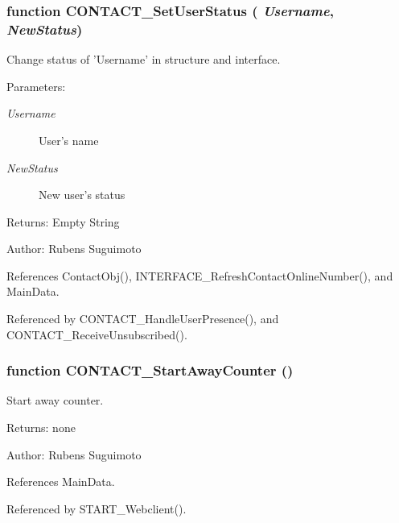 \subsubsection[CONTACT\_\-SetUserStatus]{\setlength{\rightskip}{0pt plus 5cm}function CONTACT\_\-SetUserStatus ( {\em Username}, \/   {\em NewStatus})}\label{status_8js_7682d4a0f76bd4f6c8cd0be463dbf461}


Change status of 'Username' in structure and interface. 

\begin{Desc}
\item[Parameters:]
\begin{description}
\item[{\em Username}]User's name \item[{\em NewStatus}]New user's status \end{description}
\end{Desc}
\begin{Desc}
\item[Returns:]Empty String \end{Desc}
\begin{Desc}
\item[Author:]Rubens Suguimoto \end{Desc}


References ContactObj(), INTERFACE\_\-RefreshContactOnlineNumber(), and MainData.

Referenced by CONTACT\_\-HandleUserPresence(), and CONTACT\_\-ReceiveUnsubscribed().
\subsubsection[CONTACT\_\-StartAwayCounter]{\setlength{\rightskip}{0pt plus 5cm}function CONTACT\_\-StartAwayCounter ()}\label{status_8js_bfd8821eb18904d1c0c1a284cd5abe9d}


Start away counter. 

\begin{Desc}
\item[Returns:]none \end{Desc}
\begin{Desc}
\item[Author:]Rubens Suguimoto \end{Desc}


References MainData.

Referenced by START\_\-Webclient().

